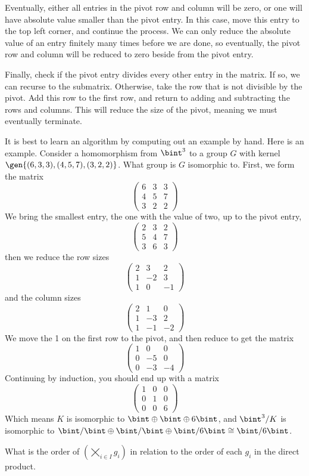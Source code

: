 Eventually, either all entries in the pivot row and column will be zero, or one will have absolute value smaller than the pivot entry. In this case, move this entry to the top left corner, and continue the process. We can only reduce the absolute value of an entry finitely many times before we are done, so eventually, the pivot row and column will be reduced to zero beside from the pivot entry.

Finally, check if the pivot entry divides every other entry in the matrix. If so, we can recurse to the submatrix. Otherwise, take the row that is not divisible by the pivot. Add this row to the first row, and return to adding and subtracting the rows and columns. This will reduce the size of the pivot, meaning we must eventually terminate.

It is best to learn an algorithm by computing out an example by hand. Here is an example. Consider a homomorphism from $\bint^3$ to a group $G$ with kernel $\gen{(6,3,3),(4,5,7),(3,2,2)}$. What group is $G$ isomorphic to. First, we form the matrix
%
\[ \begin{pmatrix} 6 & 3 & 3 \\ 4 & 5 & 7 \\ 3 & 2 & 2 \end{pmatrix} \]
%
We bring the smallest entry, the one with the value of two, up to the pivot entry,
%
\[ \begin{pmatrix} 2 & 3 & 2\\ 5 & 4 & 7\\ 3 & 6 & 3 \end{pmatrix} \]
%
then we reduce the row sizes
%
\[ \begin{pmatrix} 2 & 3 & 2\\ 1 & -2 & 3\\1 & 0 & -1 \end{pmatrix} \]
%
and the column sizes
%
\[ \begin{pmatrix} 2 & 1 & 0\\ 1 & -3 & 2\\ 1 & -1 & -2 \end{pmatrix} \]
%
We move the 1 on the first row to the pivot, and then reduce to get the matrix
%
\[ \begin{pmatrix} 1 & 0 & 0\\ 0 & -5 & 0\\ 0 & -3 & -4 \end{pmatrix} \]
%
Continuing by induction, you should end up with a matrix
%
\[ \begin{pmatrix} 1 & 0 & 0\\ 0 & 1 & 0\\ 0 & 0 & 6 \end{pmatrix} \]
%
Which means $K$ is isomorphic to $\bint \oplus \bint \oplus 6\bint$, and $\bint^3/K$ is isomorphic to $\bint/\bint \oplus \bint/\bint \oplus \bint/6\bint \cong \bint/6\bint$.

\clearpage

\begin{exercise}
    What is the order of $(\bigtimes_{i \in I} g_i)$ in relation to the order of each $g_i$ in the direct product.
\end{exercise}

